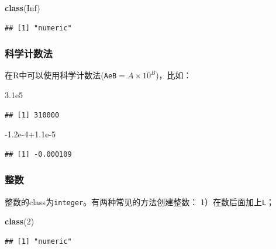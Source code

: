 \documentclass[]{book}
\newenvironment{Shaded}{\begin{snugshade}}{\end{snugshade}}
\newcommand{\DecValTok}[1]{\textcolor[rgb]{0.00,0.00,0.81}{#1}}
\newcommand{\FloatTok}[1]{\textcolor[rgb]{0.00,0.00,0.81}{#1}}
\newcommand{\KeywordTok}[1]{\textcolor[rgb]{0.13,0.29,0.53}{\textbf{#1}}}
\newcommand{\NormalTok}[1]{#1}
\newcommand{\OtherTok}[1]{\textcolor[rgb]{0.56,0.35,0.01}{#1}}
\begin{document}
\begin{Shaded}
\begin{Highlighting}[]
\KeywordTok{class}\NormalTok{(}\OtherTok{Inf}\NormalTok{)}
\end{Highlighting}
\end{Shaded}

\begin{verbatim}
## [1] "numeric"
\end{verbatim}

\subsubsection{科学计数法}

在R中可以使用科学计数法(\texttt{AeB}\(= A \times 10^B\))，比如：

\begin{Shaded}
\begin{Highlighting}[]
\FloatTok{3.1e5}
\end{Highlighting}
\end{Shaded}

\begin{verbatim}
## [1] 310000
\end{verbatim}

\begin{Shaded}
\begin{Highlighting}[]
\FloatTok{-1.2e-4+1.1e-5}
\end{Highlighting}
\end{Shaded}

\begin{verbatim}
## [1] -0.000109
\end{verbatim}

\subsubsection{整数}

整数的class为\texttt{integer}。有两种常见的方法创建整数：
1）在数后面加上\texttt{L}；

\begin{Shaded}
\begin{Highlighting}[]
\KeywordTok{class}\NormalTok{(}\DecValTok{2}\NormalTok{)}
\end{Highlighting}
\end{Shaded}

\begin{verbatim}
## [1] "numeric"
\end{verbatim}
\end{document}
